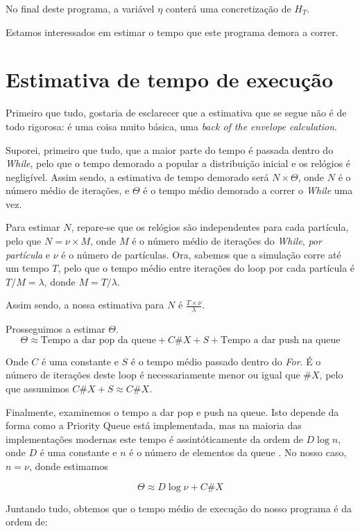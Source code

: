 \documentclass{article}
\begin{document}
	\bigskip
	
	No final deste programa, a variável $\eta$ conterá uma concretização de $H_T$.
	
	Estamos interessados em estimar o tempo que este programa demora a correr.
	
	\section{Estimativa de tempo de execução}
	
	Primeiro que tudo, gostaria de esclarecer que a estimativa que se segue não é de todo rigorosa: é uma coisa muito básica, uma \emph{back of the envelope calculation}.
	
	Suporei, primeiro que tudo, que a maior parte do tempo é passada dentro do \emph{While}, pelo que o tempo demorado a popular a distribuição inicial e os relógios é negligível. Assim sendo, a estimativa de tempo demorado será $N \times \Theta$, onde $N$ é o número médio de iterações, e $\Theta$ é o tempo médio demorado a correr o \emph{While} uma vez.
	
	Para estimar $N$, repare-se que os relógios são independentes para cada partícula, pelo que $N = \nu \times M$, onde $M$ é o número médio de iterações do \emph{While}, \emph{por partícula} e $\nu$ é o número de partículas. Ora, sabemos que a simulação corre até um tempo $T$, pelo que o tempo médio entre iterações do loop por cada partícula é $T/M = \lambda$, donde $M = T/\lambda$.
	
	Assim sendo, a nossa estimativa para $N$ é $\frac{T \times \nu}\lambda$.
	
	Prosseguimos a estimar $\Theta$.
	\[\Theta \approx \text{Tempo a dar pop da queue} + C \#X + S + \text{Tempo a dar push na queue}\]
	
	Onde $C$ é uma constante e $S$ é o tempo médio passado dentro do \emph{For}. É o número de iterações deste loop é necessariamente menor ou igual que $\#X$, pelo que assumimos $C \#X + S \approx C \#X$.
	
	Finalmente, examinemos o tempo a dar pop e push na queue. Isto depende da forma como a Priority Queue está implementada, mas na maioria das implementações modernas este tempo é assintóticamente da ordem de $D \log n$, onde $D$ é uma constante e $n$ é o número de elementos da queue \cite{wiki}. No nosso caso, $n = \nu$, donde estimamos
	
	\[\Theta \approx D \log \nu + C \#X\]
	
	Juntando tudo, obtemos que o tempo médio de execução do nosso programa é da ordem de:
	
\end{document}
